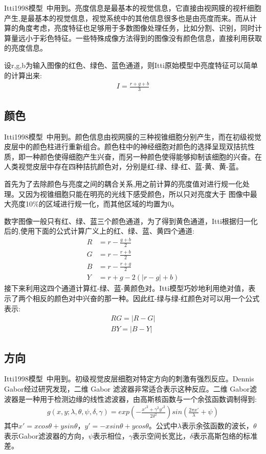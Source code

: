 \documentclass[12pt]{article}
\begin{document}
Itti1998模型~\cite{itti1998model}中用到。亮度信息是最基本的视觉信息，它直接由视网膜的视杆细胞产生,是最基本的视觉信息，视觉系统中的其他信息很多也是由亮度而来。而从计算的角度考虑，亮度特征也足够用于多数图像处理任务，比如分割、识别，同时计算量远小于彩色特征。一些特殊成像方法得到的图像没有颜色信息，直接利用获取的亮度信息。

设r,g,b为输入图像的红色、绿色、蓝色通道，则Itti原始模型中亮度特征可以简单的计算出来:
\begin{align}
I = \frac{r+g+b}{3}
\end{align}

\subsection{颜色}

Itti1998模型~\cite{itti1998model}中用到。颜色信息由视网膜的三种视锥细胞分别产生，而在初级视觉皮层中的颜色柱进行重新组合。颜色柱中的神经细胞对颜色的选择呈现双拮抗性质，即一种颜色使得细胞产生兴奋，而另一种颜色使得能够抑制该细胞的兴奋。在人类视觉皮层中存在四种拮抗颜色对，分别是红-绿、绿-红、蓝-黄、黄-蓝。

首先为了去除颜色与亮度之间的耦合关系,用之前计算的亮度值对进行规一化处理。又因为视锥细胞只能在明亮的光线下感受颜色，所以只对亮度大于 图像中最大亮度10\%的区域进行规一化，而其他区域的均置为0。

数字图像一般只有红、绿、蓝三个颜色通道，为了得到黄色通道，Itti根据归一化后的,使用下面的公式计算广义上的红、绿、蓝、黄四个通道:
\begin{align}
R & = r-\frac{g+b}{2}\\
G & = r-\frac{r+b}{2}\\
B & = r-\frac{r+g}{2}\\
Y & = r+g-2(|r-g|+b)
\end{align}
接下来利用这四个通道计算红-绿、蓝-黄颜色对。Itti模型巧妙地利用绝对值，表示了两个相反的颜色对中兴奋的那一种。因此红-绿与绿-红颜色对可以用一个公式表示:
\begin{align}
RG = |R-G|\\
BY = |B-Y|
\end{align}

\subsection{方向}

Itti1998模型~\cite{itti1998model}中用到。初级视觉皮层细胞对特定方向的刺激有强烈反应。Dennis Gabor经过研究发现，二维 Gabor 滤波器非常适合表示这种反应。二维 Gabor滤波器是一种用于检测边缘的线性滤波器，由高斯核函数与一个余弦函数调制得到:
\begin{align}
g(x, y; \lambda, \theta, \psi, \delta, \gamma) = exp\left(-\frac{x'^2+\gamma^2y'^2}{2\delta^2}\right)sin(\frac{2\pi x'}{\lambda}+\psi)
\end{align}
其中$x'=xcos\theta+ysin\theta$，$y'=-xsin\theta+ycos\theta$。公式中$\lambda$表示余弦函数的波长，$\theta$表示Gabor滤波器的方向，$\psi$表示相位，$\gamma$表示空间长宽比，$\delta$表示高斯包络的标准差。
\end{document}

